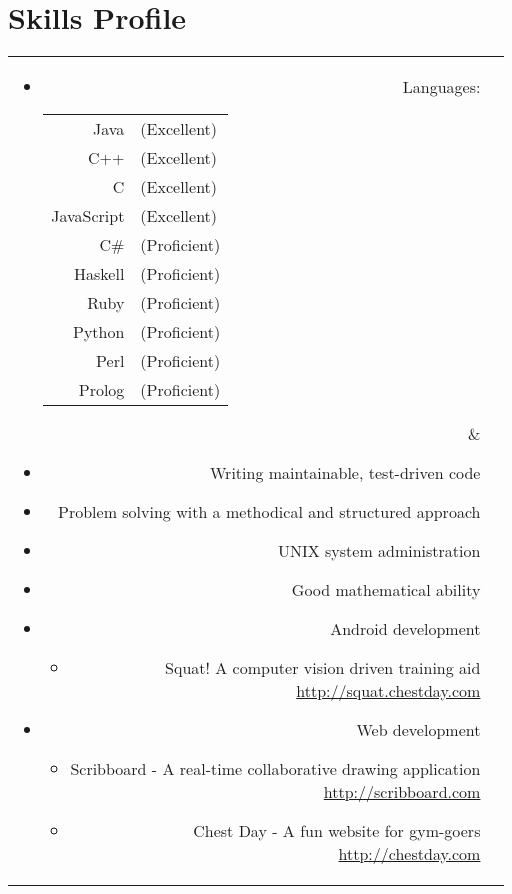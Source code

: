 \section*{Skills Profile}

\begin{tabular}{rl}

\parbox[t]{0.3\textwidth}{
	\begin{itemize}
		\item Languages:
		\begin{tabular}[h]{rl}
			Java & (Excellent)\\
			C++ & (Excellent)\\
			C & (Excellent)\\
			JavaScript & (Excellent)\\
			C\# & (Proficient)\\
			Haskell & (Proficient)\\
			Ruby & (Proficient)\\
			Python & (Proficient)\\
			Perl & (Proficient)\\
			Prolog & (Proficient)
		\end{tabular}
	\end{itemize}}
&
\parbox[t]{0.6\textwidth}{
	\begin{itemize}
		\item Writing maintainable, test-driven code
		\item Problem solving with a methodical and structured approach
		\item UNIX system administration
		\item Good mathematical ability
		\item Android development
			\begin{itemize}
				\item Squat! A computer vision driven training aid\\
				\url{http://squat.chestday.com}
			\end{itemize}
		\item Web development
			\begin{itemize}
				\item Scribboard - A real-time collaborative drawing application\\
				\url{http://scribboard.com}
				\item Chest Day - A fun website for gym-goers\\
				\url{http://chestday.com}
			\end{itemize}
	\end{itemize}}\\

\end{tabular}